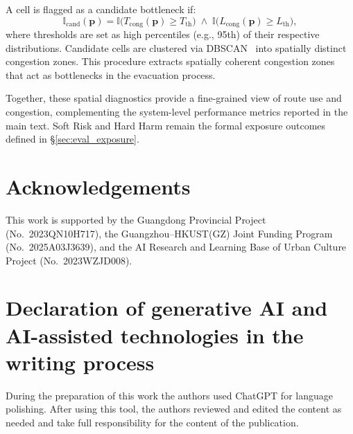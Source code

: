 \documentclass[preprint,12pt]{elsarticle}
\providecommand{\FloatBarrier}{}
\let\origsection\section
\renewcommand{\section}{\FloatBarrier\origsection}
\begin{document}
A cell is flagged as a candidate bottleneck if:
\begin{equation}
\mathbb{I}_{\mathrm{cand}}(\mathbf{p})
= \mathbb{I}\!\big(T_{\mathrm{cong}}(\mathbf{p}) \geq T_{\mathrm{th}}\big)
  \;\wedge\;
  \mathbb{I}\!\big(L_{\mathrm{cong}}(\mathbf{p}) \geq L_{\mathrm{th}}\big),
\end{equation}
where thresholds are set as high percentiles (e.g., 95th) of their
respective distributions. Candidate cells are clustered via
DBSCAN~\citep{ester1996density} into spatially distinct congestion zones.
This procedure extracts spatially coherent congestion zones that act as
bottlenecks in the evacuation process.

Together, these spatial diagnostics provide a fine-grained view of route use
and congestion, complementing the system-level performance metrics reported
in the main text. Soft Risk and Hard Harm remain the formal exposure outcomes
defined in \S\ref{sec:eval_exposure}.


\newpage
\section*{Acknowledgements}
\begin{sloppypar}
This work is supported by the Guangdong Provincial Project
(No.~2023QN10H717), the
Guangzhou--HKUST\allowbreak(GZ) Joint Funding Program
(No.~2025A03J3639), and the AI Research and Learning Base of Urban
Culture Project (No.~2023WZJD008).
\end{sloppypar}

\section*{Declaration of generative AI and AI-assisted technologies in the writing process} 
During the preparation of this work the authors used ChatGPT for language polishing. After using this tool, the authors reviewed and edited the content as needed and take full responsibility for the content of the publication.




\newpage

\end{document}
